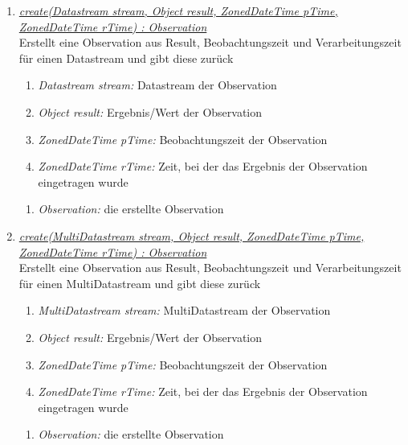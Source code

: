 \begin{enumerate}[+]
	\item \underline{\textit{create(Datastream stream, Object result, ZonedDateTime pTime,}} \\
	\underline{\textit{ ZonedDateTime rTime) : Observation}}\\
	Erstellt eine Observation aus Result, Beobachtungszeit und Verarbeitungszeit für einen Datastream und gibt diese zurück
	\begin{enumerate}[$\bullet$]
		\item \textit{Datastream stream:} Datastream der Observation
		\item \textit{Object result:} Ergebnis/Wert der Observation
		\item \textit{ZonedDateTime pTime:} Beobachtungszeit der Observation
		\item \textit{ZonedDateTime rTime:} Zeit, bei der das Ergebnis der Observation eingetragen wurde
	\end{enumerate}
	\vspace{-0.2cm}
	\begin{enumerate}[$\circ$]
		\item \textit{Observation:} die erstellte Observation
	\end{enumerate}
	
	
	\item \underline{\textit{create(MultiDatastream stream, Object result, ZonedDateTime pTime,}}\\
	\underline{\textit{ZonedDateTime rTime) : Observation}}\\
	Erstellt eine Observation aus Result, Beobachtungszeit und Verarbeitungszeit für einen MultiDatastream und gibt diese zurück
	\begin{enumerate}[$\bullet$]
		\item \textit{MultiDatastream stream:} MultiDatastream der Observation
		\item \textit{Object result:} Ergebnis/Wert der Observation
		\item \textit{ZonedDateTime pTime:} Beobachtungszeit der Observation
		\item \textit{ZonedDateTime rTime:} Zeit, bei der das Ergebnis der Observation eingetragen wurde
	\end{enumerate}
	\vspace{-0.2cm}
	\begin{enumerate}[$\circ$]
		\item \textit{Observation:} die erstellte Observation
	\end{enumerate}
	

\end{enumerate}
